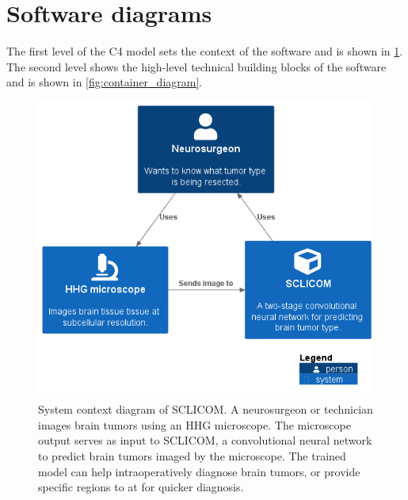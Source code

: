 \section{Software diagrams}\label{app:sclicom_c4}
The first level of the C4 model sets the context of the software and is shown in \cref{fig:context_diagram}.
The second level shows the high-level technical building blocks of the software and is shown in \cref{fig:container_diagram}.

\begin{figure}
    \centering
    \includegraphics[width=\linewidth]{images/System_context_diagram.png}
    \caption[SCLICOM system context diagram]{
        System context diagram of SCLICOM.
        A neurosurgeon or technician images brain tumors using an HHG microscope.
        The microscope output serves as input to SCLICOM, a convolutional neural network to predict brain tumors imaged by the microscope.
        The trained model can help intraoperatively diagnose brain tumors, or provide specific regions to at for quicker diagnosis.
    }
    \label{fig:context_diagram}
\end{figure}

